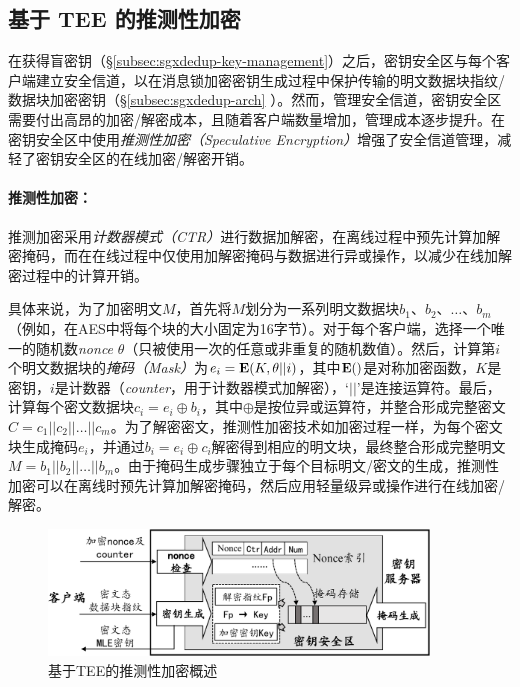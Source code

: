 \subsection{基于 TEE 的推测性加密}
\label{subsec:sgxdedup-encryption}

在获得盲密钥（\S\ref{subsec:sgxdedup-key-management}）之后，密钥安全区与每个客户端建立安全信道，以在消息锁加密密钥生成过程中保护传输的明文数据块指纹/数据块加密密钥（\S\ref{subsec:sgxdedup-arch} ）。然而，管理安全信道，密钥安全区需要付出高昂的加密/解密成本，且随着客户端数量增加，管理成本逐步提升。\sysnameS 在密钥安全区中使用\textit{推测性加密（Speculative Encryption）}\cite{eduardo2019Speculative}增强了安全信道管理，减轻了密钥安全区的在线加密/解密开销。

\paragraph*{推测性加密：}推测加密\cite{eduardo2019Speculative}采用\textit{计数器模式（CTR）}\cite{counter}进行数据加解密，在离线过程中预先计算加解密掩码，而在在线过程中仅使用加解密掩码与数据进行异或操作，以减少在线加解密过程中的计算开销。

具体来说，为了加密明文$M$，首先将$M$划分为一系列明文数据块$b_1、b_2、\ldots、b_m$（例如，在AES中将每个块的大小固定为16字节）。对于每个客户端，选择一个唯一的随机数\textit{nonce} $\theta$（只被使用一次的任意或非重复的随机数值）。然后，计算第$i$个明文数据块的\textit{掩码（Mask）}为$e_i = {\bf E}(K, \theta || i)$，其中${\bf E}()$是对称加密函数，$K$是密钥，$i$是计数器（\textit{counter}，用于计数器模式加解密），‘$||$’是连接运算符。最后，计算每个密文数据块$c_i = e_i \oplus b_i $，其中$\oplus$是按位异或运算符，并整合形成完整密文$C = c_1 || c_2 || \ldots || c_m$。为了解密密文，推测性加密技术如加密过程一样，为每个密文块生成掩码$e_i$，并通过$b_i = e_i \oplus c_i $解密得到相应的明文块，最终整合形成完整明文$M = b_1 || b_2 || \ldots || b_m$。由于掩码生成步骤独立于每个目标明文/密文的生成，推测性加密可以在离线时预先计算加解密掩码，然后应用轻量级异或操作进行在线加密/解密。

\begin{figure}[t]
\centering
\includegraphics[width=0.9\textwidth]{pic/sgxdedup/key-enclave-arch.pdf}
\caption{基于TEE的推测性加密概述}
\label{fig:sgxdedup-SpecEnc}
\end{figure}

